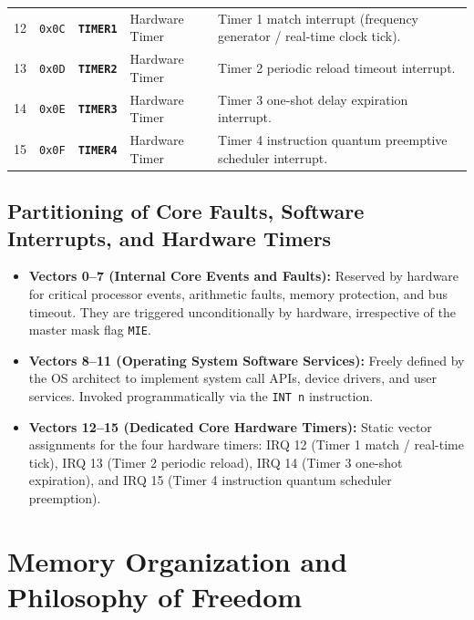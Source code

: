 \documentclass[11pt,a4paper]{article}
\begin{document}
\begin{minipage}{\textwidth}
\begin{tabularx}{\textwidth}{c c l l X}
12 & \texttt{0x0C} & \textbf{\texttt{TIMER1}} & Hardware Timer & Timer 1 match interrupt (frequency generator / real-time clock tick). \\
13 & \texttt{0x0D} & \textbf{\texttt{TIMER2}} & Hardware Timer & Timer 2 periodic reload timeout interrupt. \\
14 & \texttt{0x0E} & \textbf{\texttt{TIMER3}} & Hardware Timer & Timer 3 one-shot delay expiration interrupt. \\
15 & \texttt{0x0F} & \textbf{\texttt{TIMER4}} & Hardware Timer & Timer 4 instruction quantum preemptive scheduler interrupt. \\
\bottomrule
\end{tabularx}
\end{minipage}
\vspace{1.5mm}

\subsection{Partitioning of Core Faults, Software Interrupts, and Hardware Timers}
\begin{itemize}[leftmargin=10pt,itemsep=1.5pt,topsep=1pt,parsep=0pt]
    \item \textbf{Vectors 0--7 (Internal Core Events and Faults):} Reserved by hardware for critical processor events, arithmetic faults, memory protection, and bus timeout. They are triggered unconditionally by hardware, irrespective of the master mask flag \texttt{MIE}.
    \item \textbf{Vectors 8--11 (Operating System Software Services):} Freely defined by the OS architect to implement system call APIs, device drivers, and user services. Invoked programmatically via the \texttt{INT n} instruction.
    \item \textbf{Vectors 12--15 (Dedicated Core Hardware Timers):} Static vector assignments for the four hardware timers: IRQ 12 (Timer 1 match / real-time tick), IRQ 13 (Timer 2 periodic reload), IRQ 14 (Timer 3 one-shot expiration), and IRQ 15 (Timer 4 instruction quantum scheduler preemption).
\end{itemize}

\clearpage
\section{Memory Organization and Philosophy of Freedom}
\end{document}
